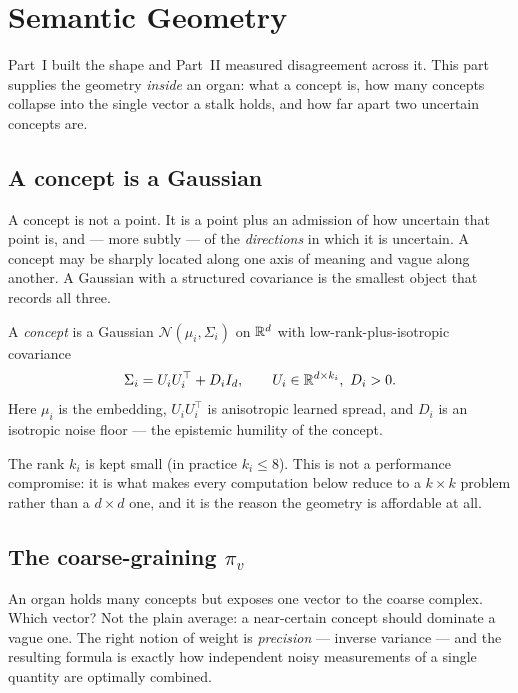 \chapter{Semantic Geometry}\label{ch:geometry}

Part~I built the shape and Part~II measured disagreement across it. This
part supplies the geometry \emph{inside} an organ: what a concept is,
how many concepts collapse into the single vector a stalk holds, and how
far apart two uncertain concepts are.

\section{A concept is a Gaussian}

\begin{intu}\Intu
A concept is not a point. It is a point plus an admission of how
uncertain that point is, and --- more subtly --- of the \emph{directions}
in which it is uncertain. A concept may be sharply located along one
axis of meaning and vague along another. A Gaussian with a structured
covariance is the smallest object that records all three.
\end{intu}

\begin{definition}[Concept]\label{def:concept-gauss}
A \emph{concept} is a Gaussian $\mathcal N(\mu_i,\Sigma_i)$ on $\mathbb{R}^{d}$
with low-rank-plus-isotropic covariance
\begin{equation}\label{eq:cov}
  \Sigma_i=U_iU_i^\top+D_i I_d,
  \qquad U_i\in\mathbb{R}^{d\times k_i},\ D_i>0 .
\end{equation}
Here $\mu_i$ is the embedding, $U_iU_i^\top$ is anisotropic learned
spread, and $D_i$ is an isotropic noise floor --- the epistemic humility
of the concept.
\end{definition}

The rank $k_i$ is kept small (in practice $k_i\le8$). This is not a
performance compromise: it is what makes every computation below reduce
to a $k\times k$ problem rather than a $d\times d$ one, and it is the
reason the geometry is affordable at all.

\section{The coarse-graining $\pi_v$}

\begin{intu}\Intu
An organ holds many concepts but exposes one vector to the coarse
complex. Which vector? Not the plain average: a near-certain concept
should dominate a vague one. The right notion of weight is
\emph{precision} --- inverse variance --- and the resulting formula is
exactly how independent noisy measurements of a single quantity are
optimally combined.
\end{intu}

